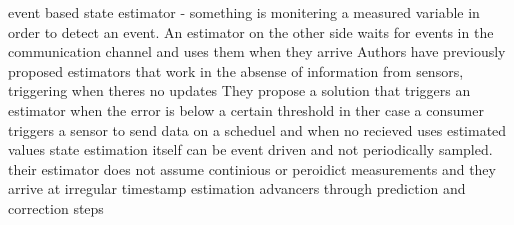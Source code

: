 \cite{martinez2015board}
event based state estimator - something is monitering a measured variable in order to detect an event. An estimator on the other side waits for events in the communication channel and uses them when they arrive
Authors have previously proposed estimators that work in the absense of information from sensors, triggering when theres no updates 
They propose a solution that triggers an estimator when the error is below a certain threshold
in ther case a consumer triggers a sensor to send data on a scheduel and when no recieved uses estimated values
state estimation itself can be event driven and not periodically sampled. their estimator does not assume continious or peroidict measurements and they arrive at irregular timestamp
estimation advancers through prediction and correction steps





